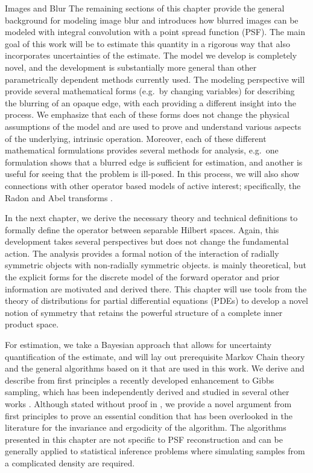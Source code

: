 \begin{chapter}{Images and Blur}
The remaining sections of this chapter provide the general background for modeling image blur and introduces how blurred images can be modeled with integral convolution with a point spread function (PSF).
The main goal of this work will be to estimate this quantity in a rigorous way that also incorporates uncertainties of the estimate.
The model we develop is completely novel, and the development is substantially more general than other parametrically dependent methods currently used.
The modeling perspective will provide several mathematical forms (e.g.~by changing variables) for describing the blurring of an opaque edge, with each providing a different insight into the process.
 We emphasize that each of these forms does not change the physical assumptions of the model and are used to prove and understand various aspects of the underlying, intrinsic operation. 
Moreover, each of these different mathematical formulations provides several methods for analysis, e.g.~one formulation shows that a blurred edge is sufficient for estimation, and another is useful for seeing that the problem is ill-posed.  
In this process, we will also show connections with other operator based models of active interest; specifically, the Radon and Abel transforms \cite{epstein2008}.

  In the next chapter, we derive the necessary theory and technical definitions to formally define the operator between separable Hilbert spaces.
  Again, this development takes several perspectives but does not change the fundamental action.
  The analysis provides a formal notion of the interaction of radially symmetric objects with non-radially symmetric objects.
   is mainly theoretical, but the explicit forms for the discrete model of the forward operator and prior information are motivated and derived there.
  This chapter will use tools from the theory of distributions for partial differential equations (PDEs) to develop a novel notion of symmetry that retains the powerful structure of a complete inner product space. 

  For estimation, we take a Bayesian approach that allows for uncertainty quantification of the estimate, and  will lay out prerequisite Markov Chain theory and the general algorithms based on it that are used in this work.
  We derive and describe from first principles a recently developed enhancement to Gibbs sampling, which has been independently derived and studied in several other works \citep{van2008partially,agapiou2014analysis}.
  Although stated without proof in \citep{van2008partially}, we provide a novel argument from first principles to prove an essential condition that has been overlooked in the literature for the invariance and ergodicity of the algorithm.
  The algorithms presented in this chapter are not specific to PSF reconstruction and can be generally applied to statistical inference problems where simulating samples from a complicated density are required.


\end{chapter}
